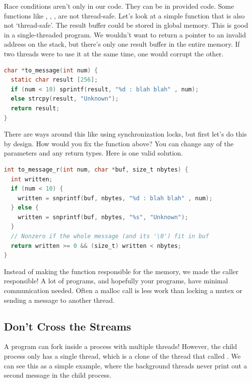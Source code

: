 Race conditions aren't only in our code.
They can be in provided code.
Some functions like , , ,  are not thread-safe.
Let's look at a simple function that is also not `thread-safe'.
The result buffer could be stored in global memory.
This is good in a single-threaded program.
We wouldn't want to return a pointer to an invalid address on the stack, but there's only one result buffer in the entire memory.
If two threads were to use it at the same time, one would corrupt the other.

\begin{lstlisting}[language=C]
char *to_message(int num) {
  static char result [256];
  if (num < 10) sprintf(result, "%d : blah blah" , num);
  else strcpy(result, "Unknown");
  return result;
}
\end{lstlisting}

There are ways around this like using synchronization locks, but first let's do this by design.
How would you fix the function above?
You can change any of the parameters and any return types.
Here is one valid solution.

\begin{lstlisting}[language=C]
int to_message_r(int num, char *buf, size_t nbytes) {
  int written;
  if (num < 10) {
    written = snprintf(buf, nbytes, "%d : blah blah" , num);
  } else {
    written = snprintf(buf, nbytes, "%s", "Unknown");
  }
  // Nonzero if the whole message (and its '\0') fit in buf
  return written >= 0 && (size_t) written < nbytes;
}
\end{lstlisting}

Instead of making the function responsible for the memory, we made the caller responsible!
A lot of programs, and hopefully your programs, have minimal communication needed.
Often a malloc call is less work than locking a mutex or sending a message to another thread.

\subsection{Don't Cross the Streams}

A program can fork inside a process with multiple threads!
However, the child process only has a single thread, which is a clone of the thread that called .
We can see this as a simple example, where the background threads never print out a second message in the child process.


